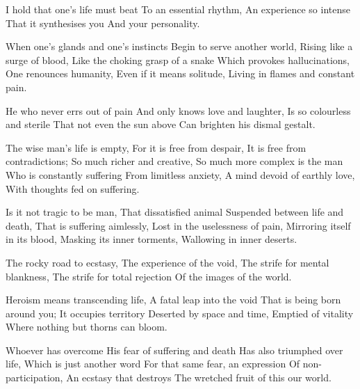 \documentclass{article}
\newenvironment{stanza}{\begin{minipage}{10cm}\begin{internallinenumbers}\obeylines}{\end{internallinenumbers}\end{minipage}\vspace{\baselineskip}}
\begin{document}
\begin{stanza}
I hold that one's life must beat
To an essential rhythm,
An experience so intense
That it synthesises you
And your personality.
\end{stanza}

\begin{stanza}
When one's glands and one's instincts 
Begin to serve another world,
Rising like a surge of blood,
Like the choking grasp of a snake
Which provokes hallucinations,
One renounces humanity,
Even if it means solitude,
Living in flames and constant pain.
\end{stanza}

\begin{stanza}
He who never errs out of pain
And only knows love and laughter,
Is so colourless and sterile
That not even the sun above
Can brighten his dismal gestalt.
\end{stanza}

\begin{stanza}
The wise man's life is empty,
For it is free from despair,
It is free from contradictions;
So much richer and creative,
So much more complex is the man
Who is constantly suffering
From limitless anxiety,
A mind devoid of earthly love,
With thoughts fed on suffering.
\end{stanza}

\begin{stanza}
Is it not tragic to be man,
That dissatisfied animal
Suspended between life and death,
That is suffering aimlessly,
Lost in the uselessness of pain,
Mirroring itself in its blood,
Masking its inner torments,
Wallowing in inner deserts.
\end{stanza}

\begin{stanza}
The rocky road to ecstasy,
The experience of the void,
The strife for mental blankness,
The strife for total rejection
Of the images of the world.
\end{stanza}

\begin{stanza}
Heroism means transcending life,
A fatal leap into the void
That is being born around you;
It occupies territory
Deserted by space and time,
Emptied of vitality
Where nothing but thorns can bloom.
\end{stanza}

\begin{stanza}
Whoever has overcome
His fear of suffering and death
Has also triumphed over life,
Which is just another word
For that same fear, an expression
Of non-participation,
An ecstasy that destroys
The wretched fruit of this our world.
\end{stanza}
\end{document}
